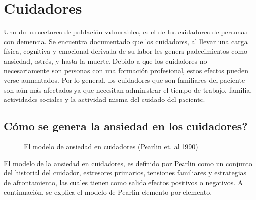 \section{Cuidadores}\label{secc:caregivers}
Uno de los sectores de poblaci\'on vulnerables, es el de los cuidadores de personas con demencia. Se encuentra documentado que los cuidadores, al llevar una carga f\'isica, cognitiva y emocional derivada de su labor les genera padecimientos como ansiedad, estr\'es, y hasta la muerte\citep{Chen2013}. Debido a que los cuidadores no necesariamente son personas con una formaci\'on profesional, estos efectos pueden verse aumentados. Por lo general, los cuidadores que son familiares del paciente son a\'un m\'as afectados ya que necesitan administrar el tiempo de trabajo, familia, actividades sociales y la actividad misma del cuidado del paciente.

\subsection{C\'omo se genera la ansiedad en los cuidadores?}\label{secc:caregiverburden}

\begin{figure}[h]
	\centering
	\caption{El modelo de ansiedad en cuidadores (Pearlin et. al 1990)} \label{fig:modeloAnsiedad}
\end{figure}
El modelo de la ansiedad en cuidadores, es definido por Pearlin como un conjunto del historial del cuidador, estresores primarios, tensiones familiares y estrategias de afrontamiento, las cuales tienen como salida efectos positivos o negativos\citep{Pearlin01101990}. A continuaci\'on, se explica el modelo de Pearlin elemento por elemento.
